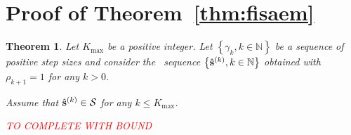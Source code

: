 \documentclass[11pt]{article}
\newtheorem*{Theorem*}{Theorem}
\theoremstyle{t}
\begin{document}
\clearpage

\section{Proof of Theorem~\ref{thm:fisaem}}\label{app:theoremfisaem}
\begin{Theorem*}
Let $K_{\max }$ be a positive integer. 
Let $\left\{\gamma_{k}, k \in \mathbb{N}\right\}$ be a sequence of positive step sizes and consider the \FISAEM\ sequence $\left\{\hat{\bss}^{(k)}, k \in \mathbb{N}\right\}$ obtained with $\rho_{k+1}=1$ for any $k>0$.

Assume that $ \hat{\bss}^{(k)} \in \mathcal{S}$ for any $k \leq K_{\max }$.

\textcolor{red}{TO COMPLETE WITH BOUND}

\end{Theorem*} 
\end{document}
